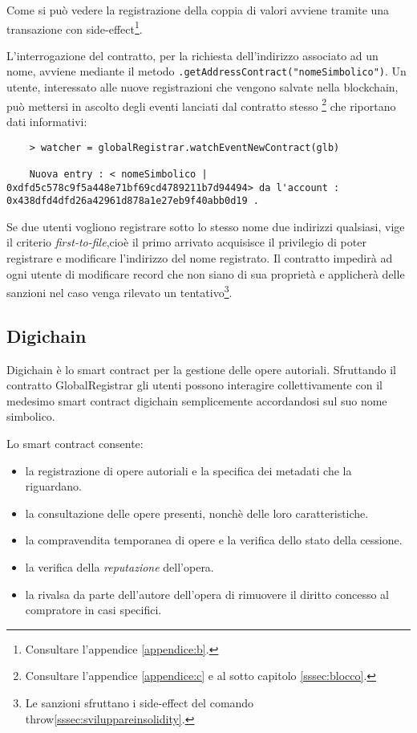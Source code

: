 	Come si può vedere la registrazione della coppia di valori avviene tramite una transazione con side-effect\footnote{Consultare l'appendice \ref{appendice:b}.}.
	
	L'interrogazione del contratto, per la richiesta dell'indirizzo associato ad un nome, avviene mediante il metodo \lstinline|.getAddressContract("nomeSimbolico")|. 
	Un utente, interessato alle nuove registrazioni che vengono salvate nella blockchain, può mettersi in ascolto degli eventi lanciati dal contratto stesso \footnote{Consultare l'appendice  \ref{appendice:c} e al sotto capitolo \ref{sssec:blocco}.} che riportano dati informativi:
	
	\begin{lstlisting}
	> watcher = globalRegistrar.watchEventNewContract(glb)
	
	Nuova entry : < nomeSimbolico | 0xdfd5c578c9f5a448e71bf69cd4789211b7d94494> da l'account : 0x438dfd4dfd26a42961d878a1e27eb9f40abb0d19 .
	\end{lstlisting}

	Se due utenti vogliono registrare sotto lo stesso nome due indirizzi qualsiasi, vige il criterio \textit{first-to-file},cioè il primo arrivato acquisisce il privilegio di poter registrare e modificare l'indirizzo del nome registrato.
	Il contratto impedirà ad ogni utente di modificare record che non siano di sua proprietà e applicherà delle sanzioni nel caso venga rilevato un tentativo\footnote{Le sanzioni sfruttano i side-effect del comando throw\ref{sssec:sviluppareinsolidity}.}.

	\subsection{Digichain}
	
	Digichain è lo smart contract per la gestione delle opere autoriali. Sfruttando il contratto GlobalRegistrar gli utenti possono interagire collettivamente con il medesimo smart contract digichain semplicemente accordandosi sul suo nome simbolico.
	
	Lo smart contract consente:
	\begin{itemize}
		\item la registrazione di opere autoriali e la specifica dei metadati che la riguardano.
		\item la consultazione delle opere presenti, nonchè delle loro caratteristiche.
		\item la compravendita temporanea di opere e la verifica dello stato della cessione.
		\item la verifica della \textit{reputazione} dell'opera.
		\item la rivalsa da parte dell'autore dell'opera di rimuovere il diritto concesso al compratore in casi specifici.
	\end{itemize}
	
